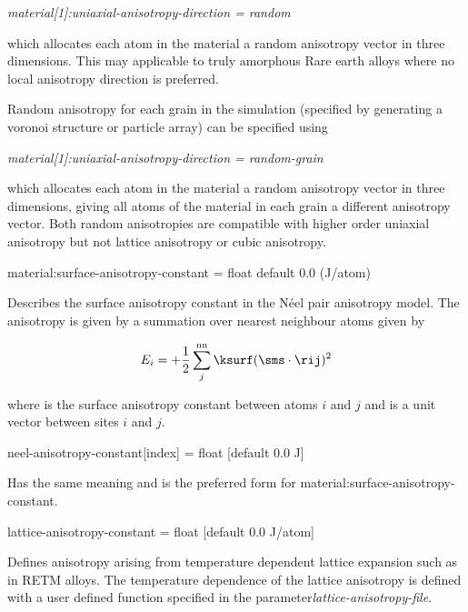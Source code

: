 \textit{material[1]:uniaxial-anisotropy-direction = random}

\noindent which allocates each atom in the material a random anisotropy vector in three dimensions. This may applicable to truly amorphous Rare earth alloys where no local anisotropy direction is preferred.

Random anisotropy for each grain in the simulation (specified by generating a voronoi structure or particle array) can be specified using

\textit{material[1]:uniaxial-anisotropy-direction = random-grain}

which allocates each atom in the material a random anisotropy vector in three dimensions, giving all atoms of the material in each grain a different
anisotropy vector. Both random anisotropies are compatible with higher order uniaxial anisotropy but not lattice anisotropy or cubic anisotropy.



{\zicf material:surface-anisotropy-constant = float default 0.0 (J/atom)} Describes the surface anisotropy constant in the N\'eel pair anisotropy model. The anisotropy is given by a summation over nearest neighbour atoms given by

\begin{equation*}
E_i = +\frac{1}{2} \sum_j^{\mathrm{nn}} \ksurf (\sms \cdot \rij )^2
\end{equation*}

\noindent where \ksurf is the surface anisotropy constant between atoms $i$ and $j$ and \rij is a unit vector between sites $i$ and $j$.

{\zicf neel-anisotropy-constant[index] = float [default 0.0 J]}
Has the same meaning and is the preferred form for material:surface-anisotropy-constant.

{\zicf lattice-anisotropy-constant = float [default 0.0 J/atom]}
Defines anisotropy arising from temperature dependent lattice expansion such as in RETM alloys. The temperature dependence of the lattice anisotropy is defined with a user defined function specified in the parameter\textit{lattice-anisotropy-file}.

